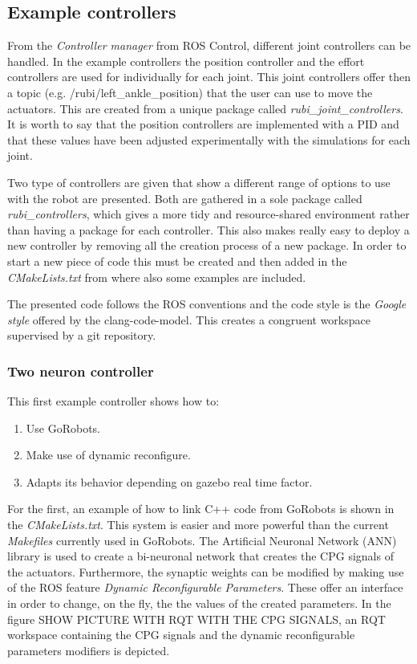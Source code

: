 
\subsection{Example controllers} %
\label{sub:example_controllers}
From the \textit{Controller manager} from ROS Control, different joint controllers can be handled.
In the example controllers the position controller and the effort controllers are used for individually for each joint.
This joint controllers offer then a topic (e.g. /rubi/left\_ankle\_position) that the user can use to move the actuators.
This are created from a unique package called \textit{rubi\_joint\_controllers}.
It is worth to say that the position controllers are implemented with a PID and that these values have been adjusted experimentally with the simulations for each joint.

Two type of controllers are given that show a different range of options to use with the robot are presented.
Both are gathered in a sole package called \textit{rubi\_controllers}, which gives a more tidy and resource-shared environment rather than having a package for each controller.
This also makes really easy to deploy a new controller by removing all the creation process of a new package.
In order to start a new piece of code this must be created and then added in the \textit{CMakeLists.txt} from where also some examples are included.

The presented code follows the ROS conventions and the code style is the \textit{Google style} offered by the clang-code-model.
This creates a congruent workspace supervised by a git repository.

\subsubsection{Two neuron controller} %
\label{ssub:two_neuron_controller}
This first example controller shows how to:
\begin{enumerate}
    \item Use GoRobots.
    \item Make use of dynamic reconfigure.
    \item Adapts its behavior depending on gazebo real time factor.
\end{enumerate}
For the first, an example of how to link C++ code from GoRobots is shown in the \textit{CMakeLists.txt}.
This system is easier and more powerful than the current \textit{Makefiles} currently used in GoRobots.
The Artificial Neuronal Network (ANN) library is used to create a bi-neuronal network that creates the CPG signals of the actuators.
Furthermore, the synaptic weights can be modified by making use of the ROS feature \textit{Dynamic Reconfigurable Parameters}.
These offer an interface in order to change, on the fly, the the values of the created parameters.
In the figure SHOW PICTURE WITH RQT WITH THE CPG SIGNALS, an RQT workspace containing the CPG signals and the dynamic reconfigurable parameters modifiers is depicted.

